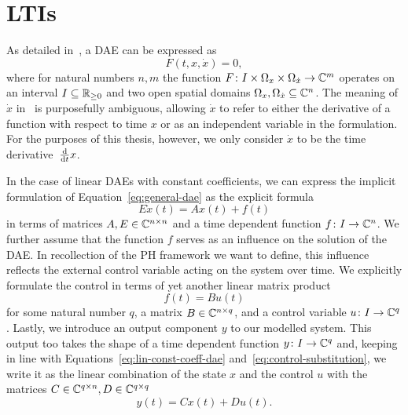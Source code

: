 \section{\aclp{LTI}}\label{sec:ltis}

As detailed in~\cite{Kunkel2006}, a \acf{DAE} can be expressed as
\begin{equation}\label{eq:general-dae}
    F(t, x, \dot{x}) = 0,
\end{equation}
where for natural numbers $n, m$ the function $F \colon I \times \Omega_x \times \Omega_{\dot{x}} \to \mathbb{C}^m$ operates on an interval $I \subseteq \mathbb{R}_{\ge 0}$ and two open spatial domains $\Omega_x, \Omega_{\dot{x}} \subseteq \mathbb{C}^n$.
The meaning of $\dot{x}$ in~\cite{Kunkel2006} is purposefully ambiguous, allowing $\dot{x}$ to refer to either the derivative of a function with respect to time $x$ or as an independent variable in the formulation.
For the purposes of this thesis, however, we only consider $\dot{x}$ to be the time derivative~$\frac{\mathop{}\!\mathrm{d}}{\mathop{}\!\mathrm{d} t} x$.

In the case of linear \acp{DAE} with constant coefficients, we can express the implicit formulation of Equation~\eqref{eq:general-dae} as the explicit formula
\begin{equation}\label{eq:lin-const-coeff-dae}
    E \dot{x}(t) = A x(t) + f(t)
\end{equation}
in terms of matrices $A, E \in \mathbb{C}^{n \times n}$ and a time dependent function $f \colon I \to \mathbb{C}^n$.
We further assume that the function $f$ serves as an influence on the solution of the \ac{DAE}.
In recollection of the \ac{PH} framework we want to define, this influence reflects the external control variable acting on the system over time.
We explicitly formulate the control in terms of yet another linear matrix product
\begin{equation}\label{eq:control-substitution}
    f(t) = B u(t)
\end{equation}
for some natural number $q$, a matrix $B \in \mathbb{C}^{n \times q}$, and a control variable $u \colon I \to \mathbb{C}^q$.
Lastly, we introduce an output component $y$ to our modelled system.
This output too takes the shape of a time dependent function $y \colon I \to \mathbb{C}^q$ and, keeping in line with Equations~\eqref{eq:lin-const-coeff-dae} and~\eqref{eq:control-substitution}, we write it as the linear combination of the state $x$ and the control $u$ with the matrices $C \in \mathbb{C}^{q \times n}, D \in \mathbb{C}^{q \times q}$
\begin{equation*}
    y(t) = C x(t) + D u(t).
\end{equation*}

